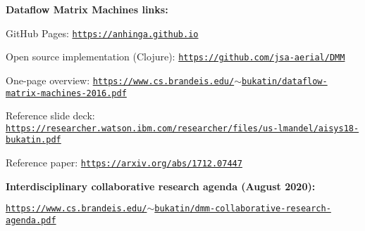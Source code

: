 \documentclass{article}
\begin{document}
\vspace{0.2in}
\noindent
{\bf Dataflow Matrix Machines links:}

\vspace{0.1in}
GitHub Pages: \href{https://anhinga.github.io/}{\tt https://anhinga.github.io}

\vspace{0.1in}
Open source implementation (Clojure): \href{https://github.com/jsa-aerial/DMM}{\tt https://github.com/jsa-aerial/DMM}

\vspace{0.1in}
One-page overview: \href{https://www.cs.brandeis.edu/~bukatin/dataflow-matrix-machines-2016.pdf}{\tt https://www.cs.brandeis.edu/$\sim$bukatin/dataflow-matrix-machines-2016.pdf}

\vspace{0.1in}
Reference slide deck: \href{https://researcher.watson.ibm.com/researcher/files/us-lmandel/aisys18-bukatin.pdf}{\footnotesize\tt https://researcher.watson.ibm.com/researcher/files/us-lmandel/aisys18-bukatin.pdf}

\vspace{0.1in}
Reference paper: \href{https://arxiv.org/abs/1712.07447}{\tt https://arxiv.org/abs/1712.07447}

\vspace{0.3in}
\noindent
{\bf Interdisciplinary collaborative research agenda (August 2020):}

\vspace{0.1in}
\href{https://www.cs.brandeis.edu/~bukatin/dmm-collaborative-research-agenda.pdf}{\tt https://www.cs.brandeis.edu/$\sim$bukatin/dmm-collaborative-research-agenda.pdf}
\end{document}
